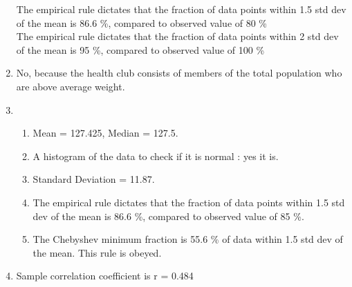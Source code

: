 \begin{enumerate}
	The empirical rule dictates that the fraction of data points within 1.5 std dev of the mean is 86.6 \%, compared to observed value of 80 \% \\
	The empirical rule dictates that the fraction of data points within 2 std dev of the mean is 95 \%, compared to observed value of 100 \% \\
	
	\item No, because the health club consists of members of the total population who are above average weight. 
	
	\item \begin{enumerate}
		\item Mean = 127.425, Median = 127.5.
		
		\item A histogram of the data to check if it is normal : yes it is.
		
		\begin{figure}[H]
			\centering
		\end{figure} 
		
		\item Standard Deviation = 11.87.
		
		\item The empirical rule dictates that the fraction of data points within 1.5 std dev of the mean is 86.6 \%, compared to observed value of 85 \%.
		
		\item The Chebyshev minimum fraction is 55.6 \% of data within 1.5 std dev of the mean. This rule is obeyed.
	\end{enumerate}
	
	\item Sample correlation coefficient is r = 0.484 \\
	
	\begin{figure}[H]
		\centering
	\end{figure}
	

\end{enumerate}
